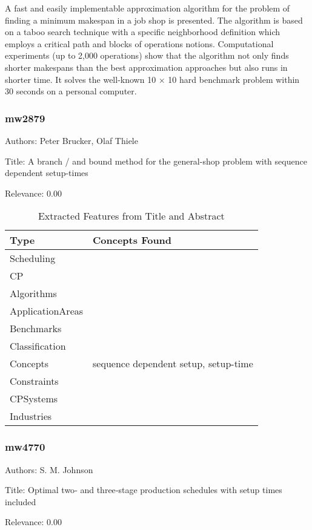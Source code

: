   A fast and easily implementable approximation algorithm for the problem of finding a minimum makespan in a job shop is presented. The algorithm is based on a taboo search technique with a specific neighborhood definition which employs a critical path and blocks of operations notions. Computational experiments (up to 2,000 operations) show that the algorithm not only finds shorter makespans than the best approximation approaches but also runs in shorter time. It solves the well-known 10 × 10 hard benchmark problem within 30 seconds on a personal computer.  

\subsubsection{mw2879}
\label{mw:mw2879}

Authors: Peter Brucker, Olaf Thiele

Title: A branch / and  bound method for the general-shop problem with sequence dependent setup-times

Relevance:  0.00

{\scriptsize
\begin{longtable}{p{2cm}p{20cm}}
\caption{Extracted Features from Title and Abstract}\\ \toprule
Type & Concepts Found\\ \midrule
\endhead
\bottomrule
\endfoot
Scheduling & \\ 
CP & \\ 
Algorithms & \\ 
ApplicationAreas & \\ 
Benchmarks & \\ 
Classification & \\ 
Concepts & sequence dependent setup, setup-time\\ 
Constraints & \\ 
CPSystems & \\ 
Industries & \\ 
\end{longtable}
}



\subsubsection{mw4770}
\label{mw:mw4770}

Authors: S. M. Johnson

Title: Optimal two‐ and three‐stage production schedules with setup times included

Relevance:  0.00

